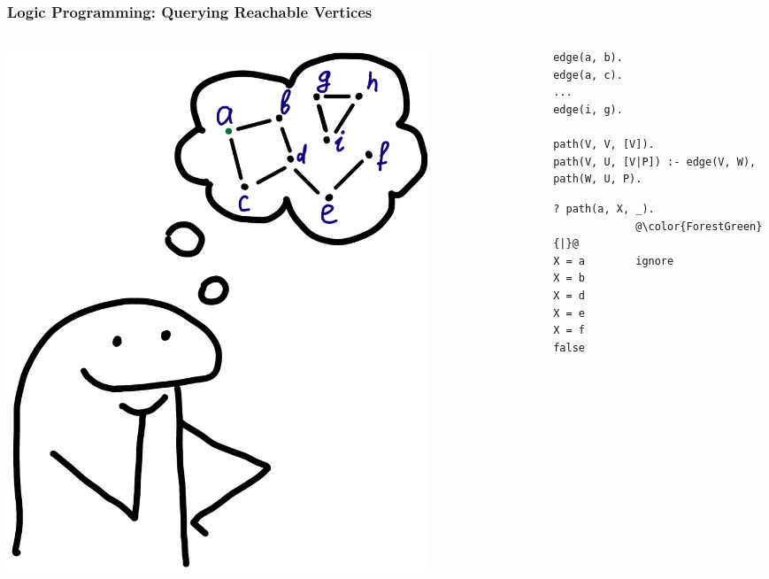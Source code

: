 \documentclass[xcolor={dvipsnames}, aspectratio=169]{beamer}
\begin{document}
\begin{frame}[fragile]
  \frametitle{Logic Programming: Querying Reachable Vertices}
  \begin{columns}    
    \begin{column}{0.35\textwidth}
      \centering
      \includegraphics[width=0.8\textwidth]{pic/graph.jpg}
    \end{column}
    \begin{column}{0.75\textwidth}       
\begin{center}
  \begin{minipage}{0.82\textwidth}
    \begin{lstlisting}[language=logic]
edge(a, b).
edge(a, c).
...
edge(i, g).

path(V, V, [V]). 
path(V, U, [V|P]) :- edge(V, W), path(W, U, P).
    \end{lstlisting}

    \begin{lstlisting}[language=query,basicstyle=\footnotesize,escapechar=@]
? path(a, X, _).
             @\color{ForestGreen}{|}@ 
X = a        ignore
X = b 
X = d 
X = e
X = f 
false 
    \end{lstlisting}
  \end{minipage}
\end{center}

      \end{column}
    \end{columns}
\end{frame}
\end{document}
